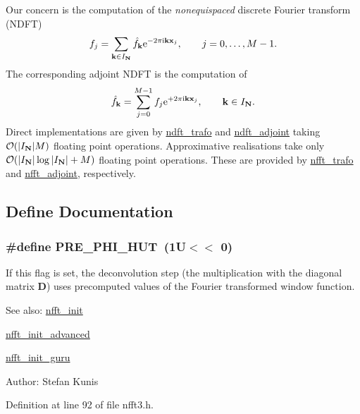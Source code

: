 Our concern is the computation of the {\em nonequispaced\/} discrete Fourier transform {\em \/}(NDFT) \label{group__nfft_ndft_formula}
\hypertarget{group__nfft_ndft_formula}{}
 \[ f_j = \sum_{\mathbf{k}\in I_{\mathbf{N}}} \hat{f}_{\mathbf{k}} {\rm e}^{-2\pi{\rm i} \mathbf{k}\mathbf{x}_j}, \qquad j=0,\hdots,M-1. \] The corresponding adjoint NDFT is the computation of \[ \hat f_{\mathbf{k}}=\sum_{j=0}^{M-1} f_j {\rm e}^{+2\pi{\rm i} \mathbf{k}\mathbf{x}_j}, \qquad \mathbf{k}\in I_{\mathbf{N}}. \] Direct implementations are given by \hyperlink{group__nfft_ga0}{ndft\_\-trafo} and \hyperlink{group__nfft_ga1}{ndft\_\-adjoint} taking ${\cal O}(|I_{\mathbf{N}}|M)$ floating point operations. Approximative realisations take only ${\cal O}(|I_{\mathbf{N}}|\log|I_{\mathbf{N}}|+M)$ floating point operations. These are provided by \hyperlink{group__nfft_ga2}{nfft\_\-trafo} and \hyperlink{group__nfft_ga3}{nfft\_\-adjoint}, respectively. 

\subsection{Define Documentation}
\hypertarget{group__nfft_ga16}{
\subsubsection[PRE\_\-PHI\_\-HUT]{\setlength{\rightskip}{0pt plus 5cm}\#define PRE\_\-PHI\_\-HUT~(1U$<$$<$ 0)}}
\label{group__nfft_ga16}


If this flag is set, the deconvolution step (the multiplication with the diagonal matrix $\mathbf{D}$) uses precomputed values of the Fourier transformed window function. 

\begin{Desc}
\item[See also:]\hyperlink{group__nfft_ga7}{nfft\_\-init} 

\hyperlink{group__nfft_ga8}{nfft\_\-init\_\-advanced} 

\hyperlink{group__nfft_ga9}{nfft\_\-init\_\-guru} \end{Desc}
\begin{Desc}
\item[Author:]Stefan Kunis \end{Desc}


Definition at line 92 of file nfft3.h.

